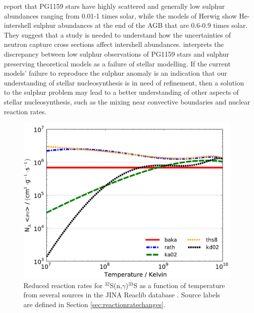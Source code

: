 \citet{Werner:2006bf} report that PG1159 stars have highly scattered and generally low sulphur abundances ranging from 0.01-1 times solar, while the models of Herwig show He-intershell sulphur abundances at the end of the AGB that are 0.6-0.9 times solar. They suggest that a study is needed to understand how the uncertainties of neutron capture cross sections affect intershell abundances. \citet{Werner:2009fb} interprets the discrepancy between low sulphur observations of PG1159 stars and sulphur preserving theoretical models as a failure of stellar modelling. If the current models' failure to reproduce the sulphur anomaly is an indication that our understanding of stellar nucleosynthesis is in need of refinement, then a solution to the sulphur problem may lead to a better understanding of other aspects of stellar nucleosynthesis, such as the mixing near convective boundaries and nuclear reaction rates.

\begin{figure}
 \begin{center}\includegraphics[width=1.0\columnwidth]{figures/reaclib-n+s32.pdf}\end{center}
 \caption{Reduced reaction rates for $^{32}$S(n,$\gamma$)$^{33}$S as a function of temperature from several sources in the JINA Reaclib database \citep{Cyburt:2010ey}. Source labels are defined in Section \ref{sec:reactionratechanges}.}\label{fig:ncapturerates}
\end{figure}

